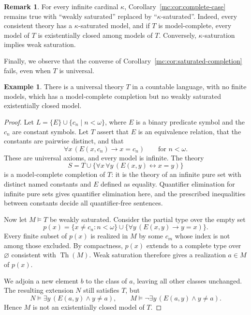 \documentclass[11pt,a4paper]{amsart}
\theoremstyle{definition}
\newtheorem{example}[theorem]{Example}
\newtheorem{remark}[theorem]{Remark}
\DeclareMathOperator{\Th}{Th}
\begin{document}
\begin{remark}
For every infinite cardinal $\kappa$,
Corollary~\ref{mc:cor:complete-case} remains true with
``weakly saturated'' replaced by ``$\kappa$-saturated''.
Indeed, every consistent theory has a $\kappa$-saturated model,
and if $T$ is model-complete, every model of $T$ is existentially
closed among models of $T$. Conversely, $\kappa$-saturation
implies weak saturation.
\end{remark}

Finally, we observe that the converse of Corollary~\ref{mc:cor:saturated-completion}
fails, even when $T$ is universal.

\begin{example}\label{mc:ex:universal}
There is a universal theory $T$ in a countable language,
with no finite models, which has a model-complete completion
but no weakly saturated existentially closed model.
\end{example}

\begin{proof}
Let $L=\{E\}\cup\{c_n\mid n<\omega\}$, where $E$ is a binary predicate symbol and
the $c_n$ are constant symbols. Let $T$ assert that $E$ is an equivalence
relation, that the constants are pairwise distinct, and that
\[
  \forall x\,(E(x,c_n)\longrightarrow x=c_n)
  \qquad \text{for $n<\omega $}.
\]
These are universal axioms, and every model is infinite. The theory
\[
  S=T\cup\{\forall x\,\forall y\,
                  (E(x,y)\leftrightarrow x=y)\}
\]
is a model-complete completion of $T$: it is the theory of an
infinite pure set with distinct named constants and $E$ defined
as equality. Quantifier elimination for infinite pure sets gives
quantifier elimination here, and the prescribed inequalities
between constants decide all quantifier-free sentences.

Now let $M\models T$ be weakly saturated. Consider the
partial type over the empty set
\[
  p(x)=\{x\neq c_n:n<\omega\}
       \cup\{\forall y\,(E(x,y)\longrightarrow y=x)\}.
\]
Every finite subset of $p(x)$ is realized in $M$ by some
$c_m$ whose index is not among those excluded.
By compactness, $p(x)$ extends to a complete type over
$\varnothing$ consistent with $\Th(M)$.
Weak saturation therefore gives a realization $a\in M$
of $p(x)$.

We adjoin a new element $b$ to the class of $a$, leaving all other
classes unchanged. The resulting extension $N$ still
satisfies $T$, but
\[
  N\models\exists y\,(E(a,y)\land y\neq a),
  \qquad
  M\models\neg\exists y\,(E(a,y)\land y\neq a).
\]
Hence $M$ is not an existentially closed model of $T$.
\end{proof}
\end{document}
